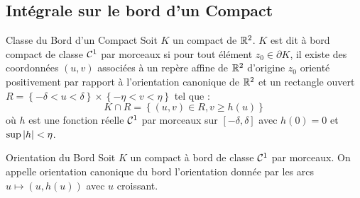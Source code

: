 \documentclass{cours}
\begin{document}
\subsection{Intégrale sur le bord d'un Compact}
\begin{définition}{Classe du Bord d'un Compact}{}
	Soit $K$ un compact de $\mathbb{R}^{2}$. $K$ est dit à bord compact de classe $\mathcal{C}^{1}$ par morceaux si pour tout élément $z_{0} \in \partial K$, il existe des coordonnées $\left(u, v\right)$ associées à un repère affine de $\mathbb{R}^{2}$ d'origine $z_{0}$ orienté positivement par rapport à l'orientation canonique de $\mathbb{R}^{2}$ et un rectangle ouvert $R = \left\{ -\delta < u < \delta\right\} \times \left\{-\eta < v < \eta\right\}$ tel que : 
	\begin{equation*}	
		K \cap R = \left\{\left(u, v\right) \in R, v \geq h\left(u\right)\right\}
		\end{equation*}
	où $h$ est une fonction réelle $\mathcal{C}^{1}$ par morceaux sur $\left[-\delta, \delta \right]$ avec $h\left(0\right) = 0$ et $\sup \left|h\right| < \eta$.
\end{définition}

\begin{définition}{Orientation du Bord}{}
	Soit $K$ un compact à bord de classe $\mathcal{C}^{1}$ par morceaux. On appelle orientation canonique du bord l'orientation donnée par les arcs $u \mapsto \left(u, h\left(u\right)\right)$ avec $u$ croissant.
\end{définition}
\end{document}
